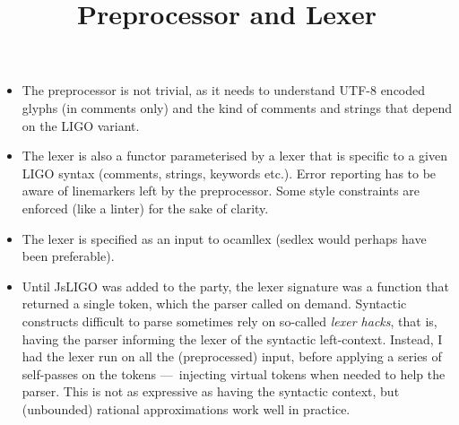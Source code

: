 \documentclass[wide]{slides}
\newcommand{\JsLIGO}[0]{\textsf{JsLIGO}}
\begin{document}
\begin{slide}
  \title{Preprocessor and Lexer}

  \begin{itemize}

    \item The preprocessor is not trivial, as it needs to understand
      UTF-8 encoded glyphs (in comments only) and the kind of comments
      and strings that depend on the LIGO variant.

    \item The lexer is also a functor parameterised by a lexer that is
      specific to a given LIGO syntax (comments, strings, keywords
      etc.). Error reporting has to be aware of linemarkers left by
      the preprocessor. Some style constraints are enforced (like a
      linter) for the sake of clarity.

    \item The lexer is specified as an input to \textsf{ocamllex}
      (\textsf{sedlex} would perhaps have been preferable).

    \item Until \JsLIGO{} was added to the party, the lexer signature
      was a function that returned a single token, which the parser
      called on demand. Syntactic constructs difficult to parse
      sometimes rely on so\hyp{}called \emph{lexer hacks}, that is,
      having the parser informing the lexer of the syntactic
      left\hyp{}context. Instead, I had the lexer run on all the
      (preprocessed) input, before applying a series of
      self\hyp{}passes on the tokens ---~injecting virtual tokens when
      needed to help the parser. This is not as expressive as having
      the syntactic context, but (unbounded) rational approximations
      work well in practice.

  \end{itemize}
\end{slide}
\end{document}
